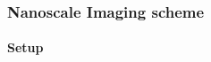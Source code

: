\documentclass[mathserif,18pt,xcolor=table,c]{beamer}
\begin{document}
  \begin{frame}[t]
    \frametitle{Nanoscale Imaging scheme}
    \framesubtitle{Setup}
    \begin{center}
      \begin{figure}[t!]
        \centering \vspace*{-.5cm}
        {\scalebox{.55}{}
        \label{fig:struct}}
      \end{figure}
    \end{center}
  \end{frame}

\end{document}
